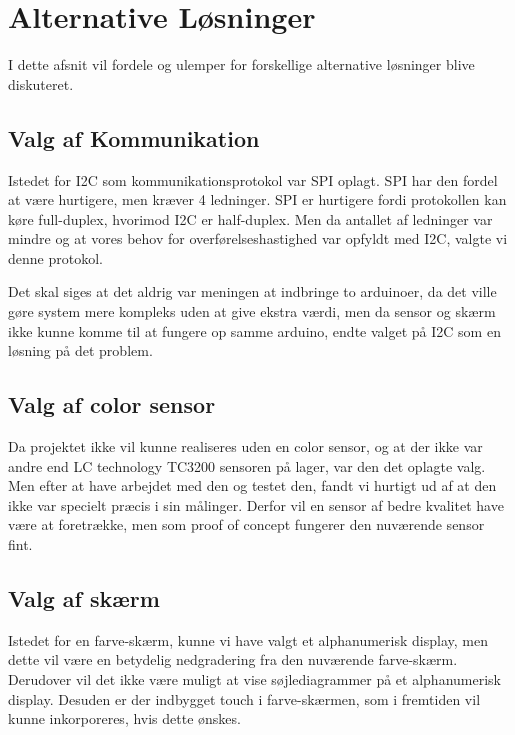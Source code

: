 \graphicspath{{Chapters/Alternative_Loesninger/}}


\section{Alternative Løsninger}
I dette afsnit vil fordele og ulemper for forskellige alternative løsninger blive diskuteret.

\subsection{Valg af Kommunikation}
Istedet for I2C som kommunikationsprotokol var SPI oplagt. SPI har den fordel at være hurtigere, men kræver 4 ledninger. SPI er hurtigere fordi protokollen kan køre full-duplex, hvorimod I2C er half-duplex. Men da antallet af ledninger var mindre og at vores behov for overførelseshastighed var opfyldt med I2C, valgte vi denne protokol.

Det skal siges at det aldrig var meningen at indbringe to arduinoer, da det ville gøre system mere kompleks uden at give ekstra værdi, men da sensor og skærm ikke kunne komme til at fungere op samme arduino, endte valget på I2C som en løsning på det problem.

\subsection{Valg af color sensor}
Da projektet ikke vil kunne realiseres uden en color sensor, og at der ikke var andre end LC technology TC3200 sensoren på lager, var den det oplagte valg. Men efter at have arbejdet med den og testet den, fandt vi hurtigt ud af at den ikke var specielt præcis i sin målinger. Derfor vil en sensor af bedre kvalitet have være at foretrække, men som proof of concept fungerer den nuværende sensor fint. 

\subsection{Valg af skærm}
Istedet for en farve-skærm, kunne vi have valgt et alphanumerisk display, men dette vil være en betydelig nedgradering fra den nuværende farve-skærm. Derudover vil det ikke være muligt at vise søjlediagrammer på et alphanumerisk display. Desuden er der indbygget touch i farve-skærmen, som i fremtiden vil kunne inkorporeres, hvis dette ønskes.
